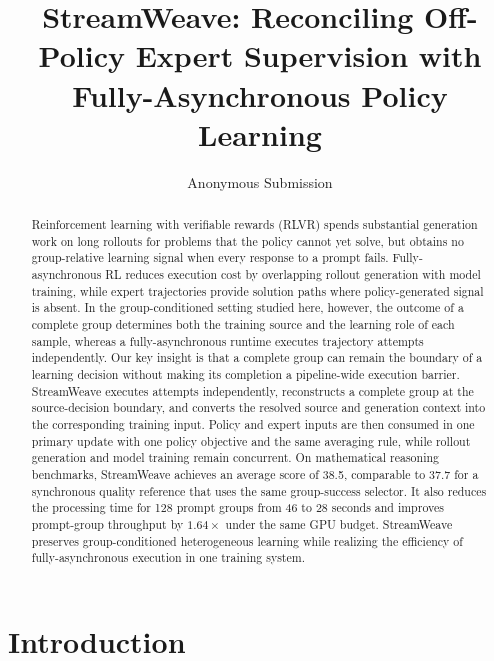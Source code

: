 \documentclass[letterpaper]{article}
\title{StreamWeave: Reconciling Off-Policy Expert Supervision with Fully-Asynchronous Policy Learning}
\author{Anonymous Submission}
\begin{document}
\maketitle

\begin{abstract}
Reinforcement learning with verifiable rewards (RLVR) spends substantial generation work on long rollouts for problems that the policy cannot yet solve, but obtains no group-relative learning signal when every response to a prompt fails.
Fully-asynchronous RL reduces execution cost by overlapping rollout generation with model training, while expert trajectories provide solution paths where policy-generated signal is absent.
In the group-conditioned setting studied here, however, the outcome of a complete group determines both the training source and the learning role of each sample, whereas a fully-asynchronous runtime executes trajectory attempts independently.
Our key insight is that a complete group can remain the boundary of a learning decision without making its completion a pipeline-wide execution barrier.
StreamWeave executes attempts independently, reconstructs a complete group at the source-decision boundary, and converts the resolved source and generation context into the corresponding training input.
Policy and expert inputs are then consumed in one primary update with one policy objective and the same averaging rule, while rollout generation and model training remain concurrent.
On mathematical reasoning benchmarks, StreamWeave achieves an average score of 38.5, comparable to 37.7 for a synchronous quality reference that uses the same group-success selector.
It also reduces the processing time for 128 prompt groups from 46 to 28 seconds and improves prompt-group throughput by $1.64\times$ under the same GPU budget.
StreamWeave preserves group-conditioned heterogeneous learning while realizing the efficiency of fully-asynchronous execution in one training system.
\end{abstract}

\section{Introduction}
\label{sec:introduction}
\end{document}
